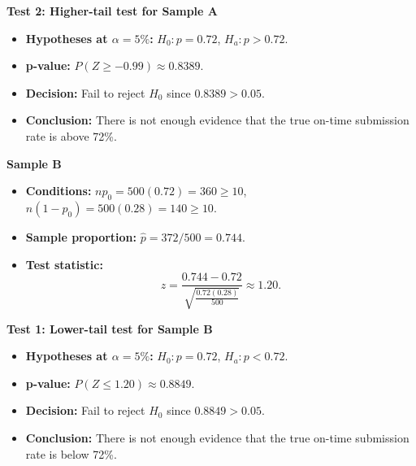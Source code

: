 \begin{center}
\end{center}


\textbf{Test 2: Higher-tail test for Sample A}

\begin{itemize}
	\item \textbf{Hypotheses at \(\alpha=5\%\):} \(H_0\colon p=0.72\), \(H_a\colon p>0.72\).
	\item \textbf{p-value:} \(P(Z\ge -0.99)\approx 0.8389\).
	\item \textbf{Decision:} Fail to reject \(H_0\) since \(0.8389>0.05\).
	\item \textbf{Conclusion:} There is not enough evidence that the true on-time submission rate is above 72\%.
\end{itemize}

\begin{center}
\end{center}


\textbf{Sample B}

\begin{itemize}
	\item \textbf{Conditions:} \(np_0=500(0.72)=360\ge10\), \(n(1-p_0)=500(0.28)=140\ge10\).
	\item \textbf{Sample proportion:} \(\hat p=372/500=0.744\).
	\item \textbf{Test statistic:}
	\[
	z=\frac{0.744-0.72}{\sqrt{\frac{0.72(0.28)}{500}}}\approx 1.20.
	\]
\end{itemize}

\textbf{Test 1: Lower-tail test for Sample B}

\begin{itemize}
	\item \textbf{Hypotheses at \(\alpha=5\%\):} \(H_0\colon p=0.72\), \(H_a\colon p<0.72\).
	\item \textbf{p-value:} \(P(Z\le 1.20)\approx 0.8849\).
	\item \textbf{Decision:} Fail to reject \(H_0\) since \(0.8849>0.05\).
	\item \textbf{Conclusion:} There is not enough evidence that the true on-time submission rate is below 72\%.
\end{itemize}

